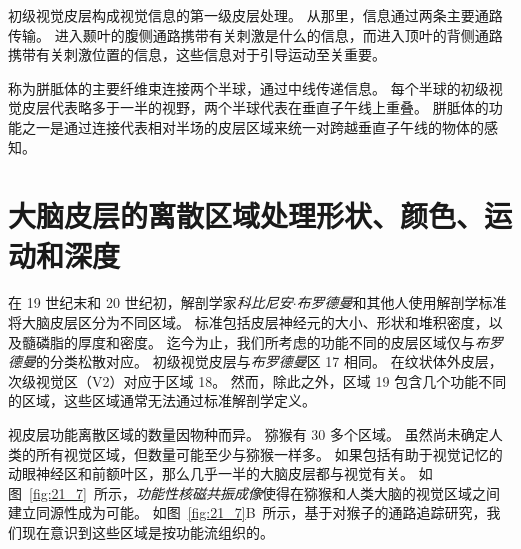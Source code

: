 初级视觉皮层构成视觉信息的第一级皮层处理。
从那里，信息通过两条主要通路传输。
进入颞叶的腹侧通路携带有关刺激是什么的信息，而进入顶叶的背侧通路携带有关刺激位置的信息，这些信息对于引导运动至关重要。


称为胼胝体的主要纤维束连接两个半球，通过中线传递信息。
每个半球的初级视觉皮层代表略多于一半的视野，两个半球代表在垂直子午线上重叠。
胼胝体的功能之一是通过连接代表相对半场的皮层区域来统一对跨越垂直子午线的物体的感知。



\section{大脑皮层的离散区域处理形状、颜色、运动和深度}

在 19 世纪末和 20 世纪初，解剖学家\textit{科比尼安$\cdot$布罗德曼}和其他人使用解剖学标准将大脑皮层区分为不同区域。
标准包括皮层神经元的大小、形状和堆积密度，以及髓磷脂的厚度和密度。
迄今为止，我们所考虑的功能不同的皮层区域仅与\textit{布罗德曼}的分类松散对应。
初级视觉皮层与\textit{布罗德曼}区 17 相同。
在纹状体外皮层，次级视觉区（V2）对应于区域 18。
然而，除此之外，区域 19 包含几个功能不同的区域，这些区域通常无法通过标准解剖学定义。


视皮层功能离散区域的数量因物种而异。
猕猴有 30 多个区域。
虽然尚未确定人类的所有视觉区域，但数量可能至少与猕猴一样多。
如果包括有助于视觉记忆的动眼神经区和前额叶区，那么几乎一半的大脑皮层都与视觉有关。
如图~\ref{fig:21_7}~所示，\textit{功能性核磁共振成像}使得在猕猴和人类大脑的视觉区域之间建立同源性成为可能。
如图~\ref{fig:21_7}B~所示，基于对猴子的通路追踪研究，我们现在意识到这些区域是按功能流组织的。


